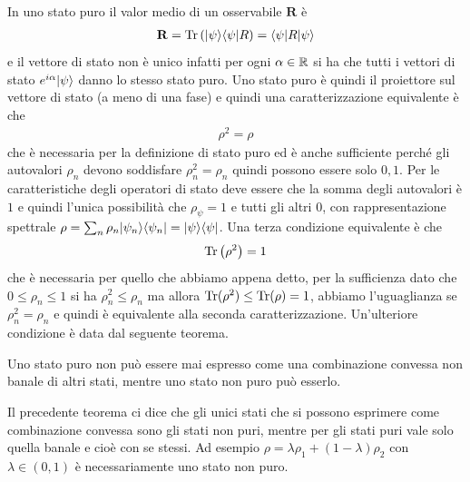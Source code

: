 In uno stato puro il valor medio di un osservabile $ \mathbf{R} $ è 
\begin{align*}
  \mathbf{R} = \operatorname{\textnormal{Tr}}\left( \vert \psi \rangle \langle \psi \vert R \right) = \langle \psi \vert R \vert \psi \rangle
\end{align*}
e il vettore di stato non è unico infatti per ogni $ \alpha \in \mathbb{R} $ si ha che tutti i vettori di stato $ e^{i\alpha} \vert \psi \rangle $ danno lo stesso stato 
puro. Uno stato puro è quindi il proiettore sul vettore di stato (a meno di una fase) e quindi una caratterizzazione equivalente è che 
\begin{align*}
  \rho^2 = \rho
\end{align*}
che è necessaria per la definizione di stato puro ed è anche sufficiente perché gli autovalori $ \rho_n $ devono soddisfare $ \rho_n^2 = \rho_n $ quindi 
possono essere solo $ 0,1 $. Per le caratteristiche degli operatori di stato deve essere che la somma degli autovalori è $ 1 $ e quindi l'unica possibilità 
che $ \rho_\psi = 1 $ e tutti gli altri $ 0 $, con rappresentazione spettrale $ \rho = \sum_n \rho_n \vert \psi_n \rangle \langle \psi_n \vert = \vert \psi \rangle \langle \psi \vert $. 
Una terza condizione equivalente è che 
\begin{align*}
  \operatorname{\textnormal{Tr}} \left( \rho^2 \right) = 1
\end{align*}
che è necessaria per quello che abbiamo appena detto, per la sufficienza dato che $ 0 \leq \rho_n \leq 1 $ si ha $ \rho_n^2 \leq \rho_n $ ma allora 
$ \operatorname{\textnormal{Tr}}(\rho^2) \leq \operatorname{\textnormal{Tr}}(\rho) = 1 $, abbiamo l'uguaglianza se $ \rho_n^2 = \rho_n $ e quindi è equivalente alla seconda caratterizzazione. Un'ulteriore 
condizione è data dal seguente teorema.

\begin{theorem}[  ]
  Uno stato puro non può essere mai espresso come una combinazione convessa non banale di altri stati, mentre uno stato non puro può esserlo.
\end{theorem}

Il precedente teorema ci dice che gli unici stati che si possono esprimere come combinazione convessa sono gli stati non puri, mentre per gli stati puri 
vale solo quella banale e cioè con se stessi. Ad esempio $ \rho = \lambda \rho_1 + (1 - \lambda) \rho_2 $ con $ \lambda \in (0,1) $ è necessariamente 
uno stato non puro.

